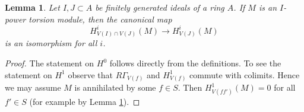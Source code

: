 \documentclass[10pt,a4paper]{amsart}
\theoremstyle{plain}
\newtheorem{lemma}[subsection]{Lemma}
\theoremstyle{definition}
\theoremstyle{remark}
\numberwithin{equation}{subsection}
\begin{document}
\begin{lemma}
\label{lemma-already-torsion}
Let $I, J \subset A$ be finitely generated ideals of a ring $A$.
If $M$ is an $I$-power torsion module, then the
canonical map
$$
H^i_{V(I) \cap V(J)}(M) \to H^i_{V(J)}(M)
$$
is an isomorphism for all $i$.
\end{lemma}

\begin{proof}
The statement on $H^0$ follows directly from the definitions.
To see the statement on $H^1$ observe that $R\Gamma_{V(f)}$
and $H^1_{V(f)}$ commute with colimits. Hence we may assume
$M$ is annihilated by some $f \in S$. Then
$H^1_{V(ff')}(M) = 0$ for all $f' \in S$ (for example by
Lemma \ref{lemma-already-torsion}).
\end{proof}
\end{document}
